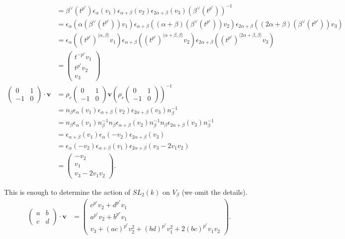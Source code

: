 \begin{align*}
&= \beta^\vee(t^{p^r}) \epsilon_\alpha (v_1)
\epsilon_{\alpha+\beta}(v_2)
\epsilon_{2\alpha+\beta}(v_3) (\beta^\vee(t^{p^r}))^{-1} \\
&= \epsilon_\alpha \left(\alpha(\beta^\vee(t^{p^r}))v_1\right)
\epsilon_{\alpha+\beta} \left((\alpha+\beta)(\beta^\vee(t^{p^r}))v_2 \right)
\epsilon_{2\alpha+\beta} \left((2\alpha+\beta)(\beta^\vee(t^{p^r}))v_3 \right)\\
&= \epsilon_\alpha \left((t^{p^r})^{\langle \alpha, \beta \rangle}v_1 \right)
\epsilon_{\alpha+\beta} \left((t^{p^r})^{\langle \alpha+\beta, \beta \rangle}v_2 \right)
\epsilon_{2\alpha+\beta} \left((t^{p^r})^{\langle 2\alpha+\beta, \beta \rangle}v_3 \right)\\
&= \left(\begin{matrix} t^{-p^r}v_1 \\ t^{p^r}v_2\\ v_3 \end{matrix}\right) \\
\left(\begin{matrix} 0 & 1 \\ -1 & 0 \end{matrix}\right) \cdot \mathbf{v} &=
\rho_r\left(\begin{matrix} 0 & 1 \\ -1 & 0\end{matrix}\right) \mathbf{v}\left( \rho_r\left(\begin{matrix} 0 & 1 \\ -1 & 0\end{matrix}\right)\right)^{-1} \\
&= n_\beta  \epsilon_\alpha (v_1)\epsilon_{\alpha+\beta}(v_2) \epsilon_{2\alpha+\beta}(v_3) n_\beta^{-1}\\
&= n_\beta  \epsilon_\alpha (v_1) n_\beta^{-1}n_\beta \epsilon_{\alpha+\beta}(v_2) n_\beta^{-1} n_\beta \epsilon_{2\alpha+\beta}(v_3) n_\beta^{-1}\\
&= \epsilon_{\alpha+\beta} (v_1) \epsilon_{\alpha}(-v_2)  \epsilon_{2\alpha+\beta}(v_3) \\
&=\epsilon_{\alpha}(-v_2)  \epsilon_{\alpha+\beta} (v_1)  \epsilon_{2\alpha+\beta}(v_3 - 2v_1v_2) \\
&= \left(\begin{matrix} -v_2 \\ v_1 \\ v_3 - 2v_1v_2 \end{matrix}\right).
\end{align*}

This is enough to determine the action of $SL_2(k)$ on $V_\beta$ (we omit the details).
\begin{align*}
\left(\begin{matrix}
a & b \\ c & d
\end{matrix} \right) \cdot \mathbf{v} &=
\left(\begin{matrix}
c^{p^r}v_2 + d^{p^r}v_1 \\
a^{p^r}v_2 + b^{p^r}v_1 \\
v_3 + (ac)^{p^r}v_2^2 + (bd)^{p^r}v_1^2 + 2(bc)^{p^r}v_1v_2
\end{matrix}\right).
\end{align*}

